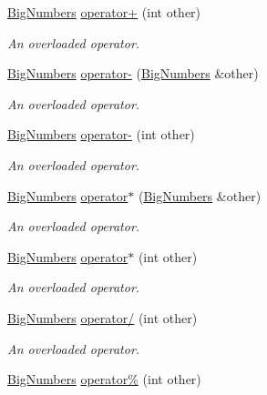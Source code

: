 \begin{DoxyCompactItemize}
\mbox{\hyperlink{class_big_numbers}{Big\+Numbers}} \mbox{\hyperlink{class_big_numbers_a577623597af4ede2c93fd076e9ea0a38}{operator+}} (int other)
\begin{DoxyCompactList}\small\item\em An overloaded operator. \end{DoxyCompactList}\item 
\mbox{\hyperlink{class_big_numbers}{Big\+Numbers}} \mbox{\hyperlink{class_big_numbers_a497890bdf8b229213c617574c0cf2146}{operator-\/}} (\mbox{\hyperlink{class_big_numbers}{Big\+Numbers}} \&other)
\begin{DoxyCompactList}\small\item\em An overloaded operator. \end{DoxyCompactList}\item 
\mbox{\hyperlink{class_big_numbers}{Big\+Numbers}} \mbox{\hyperlink{class_big_numbers_a1905c23eddbec66217222f7d16bde5fd}{operator-\/}} (int other)
\begin{DoxyCompactList}\small\item\em An overloaded operator. \end{DoxyCompactList}\item 
\mbox{\hyperlink{class_big_numbers}{Big\+Numbers}} \mbox{\hyperlink{class_big_numbers_a419de516c4d9799decdb604d0dbef9a4}{operator$\ast$}} (\mbox{\hyperlink{class_big_numbers}{Big\+Numbers}} \&other)
\begin{DoxyCompactList}\small\item\em An overloaded operator. \end{DoxyCompactList}\item 
\mbox{\hyperlink{class_big_numbers}{Big\+Numbers}} \mbox{\hyperlink{class_big_numbers_a67e09d8ec4ff009ced71beb3a1c3629a}{operator$\ast$}} (int other)
\begin{DoxyCompactList}\small\item\em An overloaded operator. \end{DoxyCompactList}\item 
\mbox{\hyperlink{class_big_numbers}{Big\+Numbers}} \mbox{\hyperlink{class_big_numbers_a81092d96f7775984c5e6ab79c603b8c2}{operator/}} (int other)
\begin{DoxyCompactList}\small\item\em An overloaded operator. \end{DoxyCompactList}\item 
\mbox{\hyperlink{class_big_numbers}{Big\+Numbers}} \mbox{\hyperlink{class_big_numbers_a397facc00a6e8867c162bd0b65aab7c3}{operator\%}} (int other)

\end{DoxyCompactItemize}
